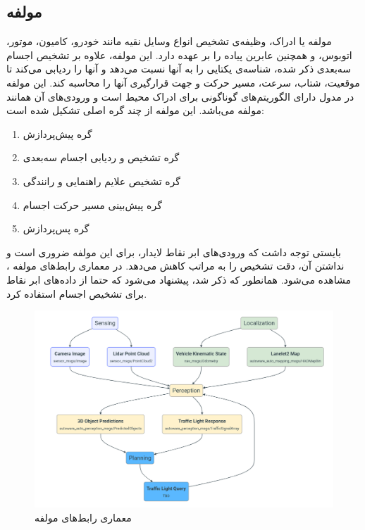 \subsection{مولفه }
مولفه  یا ادراک، وظیفه‌ی تشخیص انواع وسایل نقیه مانند خودرو، کامیون، موتور، اتوبوس، و همچنین عابرین پیاده را بر عهده دارد. این مولفه، علاوه بر تشخیص اجسام سه‌بعدی ذکر شده، شناسه‌ی یکتایی را به آنها نسبت می‌دهد و آنها را ردیابی  می‌کند تا موقعیت، شتاب، سرعت، مسیر حرکت و جهت قرارگیری آنها را محاسبه کند. این مولفه در مدول  دارای الگوریتم‌های گوناگونی برای ادراک محیط است و ورودی‌های آن همانند مولفه  می‌باشد. این مولفه از چند گره اصلی تشکیل شده است:
\begin{enumerate}
    \item گره‌ پیش‌پردازش
    \item گره تشخیص  و ردیابی اجسام سه‌بعدی
    \item گره تشخیص علایم راهنمایی و رانندگی
    \item گره پیش‌بینی مسیر حرکت اجسام
    \item گره پس‌پردازش
\end{enumerate}

بایستی توجه داشت که ورودی‌های ابر نقاط لایدار، برای این مولفه ضروری است و نداشتن آن، دقت تشخیص را به مراتب کاهش می‌دهد. در معماری رابط‌های مولفه ، مشاهده می‌شود. همانطور که ذکر شد، پیشنهاد می‌شود که حتما از داده‌های ابر نقاط برای تشخیص اجسام استفاده کرد.

\begin{figure}[h!]
    \centering
    \includegraphics[width=0.85\linewidth]{Autoware_Perception_Interface_Architecture.png}
    \caption{معماری رابط‌های مولفه  \cite{Autoware:Documentation}}
    \label{fig:Autoware_Perception_Interface_Architecture}
\end{figure}

